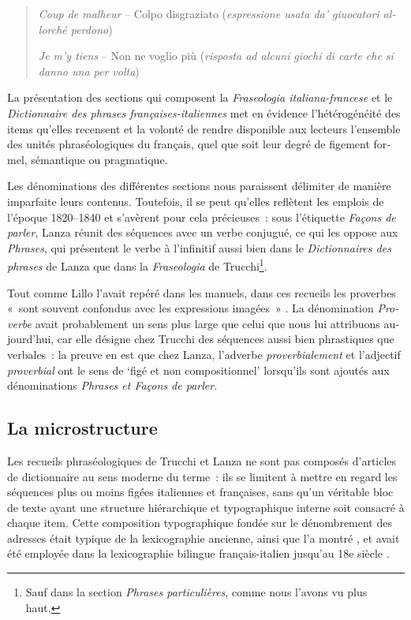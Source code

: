 \documentclass[output=paper,booklanguage=french]{langscibook}
\begin{document}
\begin{otherlanguage}{french}
\begin{quote}
    \emph{Coup de malheur} – Colpo disgraziato (\emph{espressione usata da’ giuocatori allorché perdono})

    \emph{Je m’y tiens} – Non ne voglio più (\emph{risposta ad alcuni giochi di carte che si danno una per volta})
\end{quote}

La présentation des sections qui composent la \emph{Fraseologia italiana-francese} et le \emph{Dictionnaire des phrases françaises-italiennes} met en évidence l’hétérogénéité des items qu’elles recensent et la volonté de rendre disponible aux lecteurs l’ensemble des unités phraséologiques du français, quel que soit leur degré de figement formel, sémantique ou pragmatique.

Les dénominations des différentes sections nous paraissent délimiter de manière imparfaite leurs contenus. Toutefois, il se peut qu’elles reflètent les emplois de l’époque 1820--1840 et s’avèrent pour cela précieuses~: sous l’étiquette \emph{Façons de parler}, Lanza réunit des séquences avec un verbe conjugué, ce qui les oppose aux \emph{Phrases}, qui présentent le verbe à l’infinitif aussi bien dans le \emph{Dictionnaires des phrases} de Lanza que dans la \emph{Fraseologia} de Trucchi\footnote{Sauf dans la section \emph{Phrases particulières}, comme nous l’avons vu plus haut.}. 

Tout comme Lillo l’avait repéré dans les manuels, dans ces recueils les proverbes «~sont souvent confondus avec les expressions imagées~» \citet[71]{Lillo1994}. La dénomination \emph{Proverbe} avait probablement un sens plus large que celui que nous lui attribuons aujourd’hui, car elle désigne chez Trucchi des séquences aussi bien phrastiques que verbales~: la preuve en est que chez Lanza, l’adverbe \emph{proverbialement} et l’adjectif \emph{proverbial} ont le sens de ‘figé et non compositionnel’ lorsqu’ils sont ajoutés aux dénominations \emph{Phrases et Façons de parler}.

\subsection{La microstructure}

Les recueils phraséologiques de Trucchi et Lanza ne sont pas composés d’articles de dictionnaire au sens moderne du terme~: ils se limitent à mettre en regard les séquences plus ou moins figées italiennes et françaises, sans qu’un véritable bloc de texte ayant une structure hiérarchique et typographique interne soit consacré à chaque item. Cette composition typographique fondée sur le dénombrement des adresses était typique de la lexicographie ancienne, ainsi que l’a montré \citet[467]{Quemada1967}, et avait été employée dans la lexicographie bilingue français-italien jusqu’au 18e siècle \citep[85--6]{Murano2013a}.


\end{otherlanguage}
\end{document}
